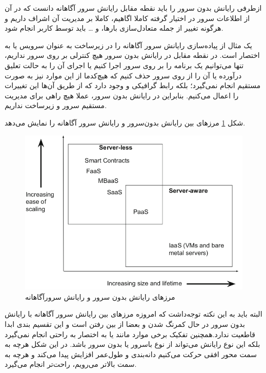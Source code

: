\par
ازطرفی رایانش بدون سرور را باید نقطه مقابل رایانش سرور آگاهانه  دانست که در آن از اطلاعات سرور در اختیار گرفته کاملا اگاهیم، کاملا بر مدیریت آن اشراف داریم و هرگونه تغییر از جمله متعادل‌سازی بارها،  و … باید توسط کاربر انجام شود.

\par
یک مثال از پیاده‌سازی رایانش سرور آگاهانه را در زیرساخت به عنوان سرویس  یا به اختصار  است. در نقطه مقابل در رایانش بدون سرور هیچ کنترلی بر روی سرور نداریم، تنها می‌توانیم یک برنامه را بر روی سرور اجرا کنیم یا اجرای آن را به حالت تعلیق درآورده یا آن را از روی سرور حذف کنیم که هیچ‌کدما از این موارد نیز به صورت مستقیم انجام نمی‌گیرد؛ بلکه رابط گرافیکی و  وجود دارد که از طریق آن‌‌ها این تغییرات را اعمال می‌کنیم. بنابراین در رایانش بدون سرور، عملا هیچ راهی برای مدیریت مستقیم سرور و زیرساخت نداریم.

شکل \ref{fig:ServerlessVSServeraware} مرز‌های بین رایانش بدون‌سرور و رایانش سرور آگاهانه را نمایش می‌دهد.  

\begin{figure}
	\centering
	\includegraphics[width=\linewidth]{figs/ServerlessVSServeraware}
	\caption {مرز‌های رایانش بدون سرور و رایانش سرورآگاهانه}
	\label{fig:ServerlessVSServeraware}
\end{figure}

\par
البته باید به این نکته توجه‌داشت که امروزه مرز‌های بین رایانش سرور آگاهانه با رایانش بدون سرور در حال کمرنگ شدن و بعضا از بین رفتن است و این تقسیم بندی ابدا قاطعیت ندارد.همچنین تفکیک برخی موارد مانند  یا به اختصار  به راحتی انجام نمی‌گیرد بلکه این نوع رایانش می‌تواند از نوع باسرور یا بدون سرور باشد. 
در این شکل هرچه به سمت محور افقی حرکت می‌کنیم دانه‌بندی و طول‌عمر افزایش پیدا می‌کند و هرچه به سمت بالاتر می‌رویم،  راحت‌تر انجام می‌گیرد. 

